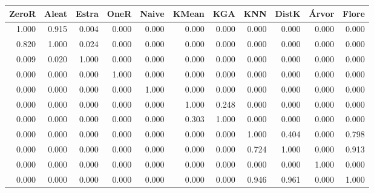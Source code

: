 \begin{table}
\centering
\label{Digits_p_value_table}
\begin{tabular}{rrrrrrrrrrr}
\toprule
ZeroR & Aleat & Estra & OneR  & Naive & KMean &   KGA &   KNN & DistK & Árvor & Flore \\
\midrule
1.000 & 0.915 & 0.004 & 0.000 & 0.000 & 0.000 & 0.000 & 0.000 & 0.000 & 0.000 & 0.000 \\
0.820 & 1.000 & 0.024 & 0.000 & 0.000 & 0.000 & 0.000 & 0.000 & 0.000 & 0.000 & 0.000 \\
0.009 & 0.020 & 1.000 & 0.000 & 0.000 & 0.000 & 0.000 & 0.000 & 0.000 & 0.000 & 0.000 \\
0.000 & 0.000 & 0.000 & 1.000 & 0.000 & 0.000 & 0.000 & 0.000 & 0.000 & 0.000 & 0.000 \\
0.000 & 0.000 & 0.000 & 0.000 & 1.000 & 0.000 & 0.000 & 0.000 & 0.000 & 0.000 & 0.000 \\
0.000 & 0.000 & 0.000 & 0.000 & 0.000 & 1.000 & 0.248 & 0.000 & 0.000 & 0.000 & 0.000 \\
0.000 & 0.000 & 0.000 & 0.000 & 0.000 & 0.303 & 1.000 & 0.000 & 0.000 & 0.000 & 0.000 \\
0.000 & 0.000 & 0.000 & 0.000 & 0.000 & 0.000 & 0.000 & 1.000 & 0.404 & 0.000 & 0.798 \\
0.000 & 0.000 & 0.000 & 0.000 & 0.000 & 0.000 & 0.000 & 0.724 & 1.000 & 0.000 & 0.913 \\
0.000 & 0.000 & 0.000 & 0.000 & 0.000 & 0.000 & 0.000 & 0.000 & 0.000 & 1.000 & 0.000 \\
0.000 & 0.000 & 0.000 & 0.000 & 0.000 & 0.000 & 0.000 & 0.946 & 0.961 & 0.000 & 1.000 \\
\bottomrule
\end{tabular}
\end{table}
